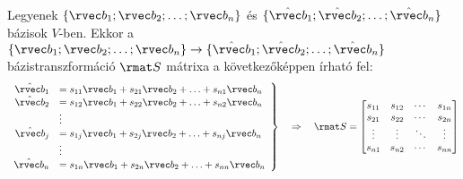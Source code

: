 \documentclass[a4paper, 12pt]{scrartcl}
\begin{document}
\begin{definition}[Bázistranszformáció]
  Legyenek $\{ \rvec b_1; \rvec b_2; \ldots; \rvec b_n \}$ és
  $\{ \hat{\rvec b}_1; \hat{\rvec b}_2; \ldots; \hat{\rvec b}_n \}$ bázisok
  $V$-ben. Ekkor a $\{ \rvec b_1; \rvec b_2; \ldots; \rvec b_n \} \rightarrow
    \{ \hat{\rvec b}_1; \hat{\rvec b}_2; \ldots; \hat{\rvec b}_n \}$
  bázistranszformáció $\rmat S$ mátrixa a következőképpen írható fel:
  $$
    \left.\begin{array}{rl}
      \hat{\rvec b}_1 & = s_{11} \rvec b_1 + s_{21} \rvec b_2 + \ldots + s_{n1} \rvec b_n \\
      \hat{\rvec b}_2 & = s_{12} \rvec b_1 + s_{22} \rvec b_2 + \ldots + s_{n2} \rvec b_n \\
                      & \vdots                                                            \\
      \hat{\rvec b}_j & = s_{1j} \rvec b_1 + s_{2j} \rvec b_2 + \ldots + s_{nj} \rvec b_n \\
                      & \vdots                                                            \\
      \hat{\rvec b}_n & = s_{1n} \rvec b_1 + s_{2n} \rvec b_2 + \ldots + s_{nn} \rvec b_n
    \end{array}\right\}
    \quad\Rightarrow\quad
    \rmat S = \begin{bmatrix}
      s_{11} & s_{12} & \cdots & s_{1n} \\
      s_{21} & s_{22} & \cdots & s_{2n} \\
      \vdots & \vdots & \ddots & \vdots \\
      s_{n1} & s_{n2} & \cdots & s_{nn}
    \end{bmatrix}
  $$
\end{definition}
\end{document}
